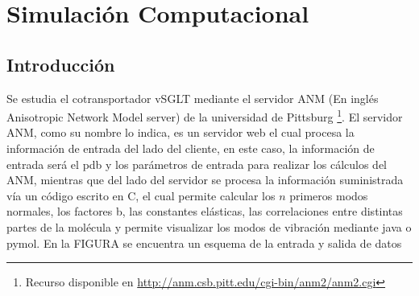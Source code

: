 \chapter{Simulaci\'{o}n Computacional}

\section{Introducci\'{o}n}
Se estudia el cotransportador vSGLT mediante el servidor ANM (En ingl\'{e}s Anisotropic Network Model server) de la universidad de Pittsburg \cite{Eyal2015}\footnote{Recurso disponible en \url{http://anm.csb.pitt.edu/cgi-bin/anm2/anm2.cgi}}. El servidor ANM, como su nombre lo indica, es un servidor web el cual procesa la informaci\'{o}n de entrada del lado del cliente, en este caso, la informaci\'{o}n de entrada ser\'{a} el pdb y los par\'{a}metros de entrada para realizar los c\'{a}lculos del ANM, mientras que del lado del servidor se procesa la informaci\'{o}n suministrada v\'{i}a un c\'{o}digo escrito en C, el cual permite calcular los $n$ primeros modos normales, los factores b, las constantes el\'{a}sticas, las correlaciones entre distintas partes de la mol\'{e}cula y permite visualizar los modos de vibraci\'{o}n mediante java o pymol. En la FIGURA se encuentra un esquema de la entrada y salida de datos
